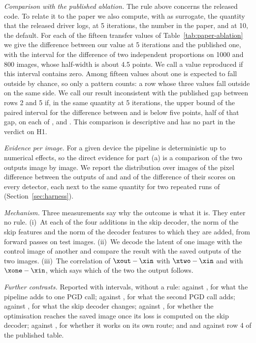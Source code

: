 \emph{Comparison with the published ablation.} The rule above concerns the released code. To
relate it to the paper we also compute, with \detS as surrogate, the quantity that the released
driver logs, at 5 iterations, the number in the paper, and at 10, the default. For each of the
fifteen transfer values of Table~\ref{tab:paper-ablation} we give the difference between our value
at 5 iterations and the published one, with the interval for the difference of two independent
proportions on 1000 and 800 images, whose half-width is about 4.5 points. We call a value
reproduced if this interval contains zero. Among fifteen values about one is expected to fall
outside by chance, so only a pattern counts: a row whose three values fall outside on the same
side. We call our result inconsistent with the published gap between rows 2 and 5 if, in the same
quantity at 5 iterations, the upper bound of the paired interval for the difference between
 and  is below five points, half of that gap, on each of \detE, \detR and \detD.
This comparison is descriptive and has no part in the verdict on H1.

\emph{Evidence per image.} For a given device the pipeline is deterministic up to numerical
effects, so the direct evidence for part (a) is a comparison of the two outputs image by image. We
report the distribution over images of the pixel difference between the outputs of  and
 and of the difference of their scores on every detector, each next to the same quantity
for two repeated runs of  (Section~\ref{sec:harness}).

\emph{Mechanism.} Three measurements say why the outcome is what it is. They enter no rule.
(i)~At each of the four additions in the skip decoder, the norm of the skip features and the norm
of the decoder features to which they are added, from forward passes on test images. (ii)~We decode
the latent of one image with the control image of another and compare the result with the saved
outputs of the two images. (iii)~The correlation of $\xout-\xin$ with $\xtwo-\xin$ and with
$\xone-\xin$, which says which of the two the output follows.

\emph{Further contrasts.} Reported with intervals, without a rule:  against , for
what the pipeline adds to one PGD call;  against , for what the second PGD call
adds;  against , for what the skip decoder changes;  against , for
whether the optimisation reaches the saved image once its loss is computed on the skip decoder;
 against , for whether it works on its own route; and  and 
against row 4 of the published table.

